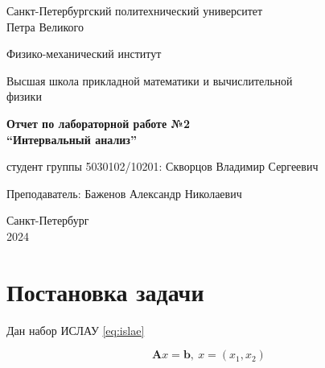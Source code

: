\documentclass{article}
\begin{document}
  \begin{titlepage}
    \begin{center}
      Санкт-Петербургский политехнический университет \\Петра Великого
    \end{center}

    \begin{center}
      Физико-механический институт
    \end{center}

    \begin{center}
      Высшая школа прикладной математики и вычислительной\\ физики
    \end{center}

    \vspace{8em}

    \begin{center}
      \textbf{Отчет по лабораторной работе №2}\\
      \textbf{“Интервальный анализ”}
    \end{center}

    \vspace{\fill}

    \begin{flushright}
       студент группы 5030102/10201:
      \hfill
      Скворцов Владимир Сергеевич \\
    \end{flushright}
    Преподаватель: \hfill Баженов Александр Николаевич

    \vspace{12em}

    \begin{center}
      Санкт-Петербург\\
      2024
    \end{center}
  \end{titlepage}

  \tableofcontents

  \newpage

  \section{Постановка задачи}

  Дан набор ИСЛАУ \ref{eq:islae}

  \begin{equation} \label{eq:islae}
    \mathbf{A}x = \mathbf{b}, \ x = (x_1, x_2)
  \end{equation}
\end{document}
